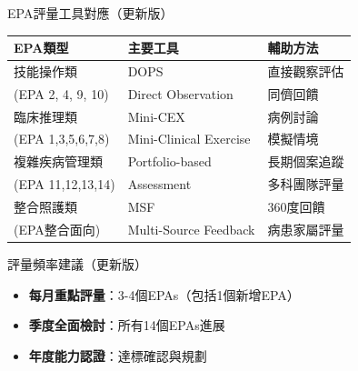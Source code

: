 \documentclass[aspectratio=169]{beamer}
\begin{document}
\begin{frame}{EPA評量工具對應（更新版）}
\begin{table}
\centering
\footnotesize
\begin{tabular}{|l|l|l|}
\hline
\rowcolor{emergency_blue!20}
\textbf{EPA類型} & \textbf{主要工具} & \textbf{輔助方法} \\
\hline
技能操作類 & DOPS & 直接觀察評估 \\
(EPA 2, 4, 9, 10) & \scriptsize Direct Observation & 同儕回饋 \\
\hline
臨床推理類 & Mini-CEX & 病例討論 \\
(EPA 1,3,5,6,7,8) & \scriptsize Mini-Clinical Exercise & 模擬情境 \\
\hline
\rowcolor{emergency_red!10}
複雜疾病管理類 & Portfolio-based & 長期個案追蹤 \\
\rowcolor{emergency_red!10}
(EPA 11,12,13,14) & Assessment & 多科團隊評量 \\
\hline
整合照護類 & MSF & 360度回饋 \\
(EPA整合面向) & \scriptsize Multi-Source Feedback & 病患家屬評量 \\
\hline
\end{tabular}
\end{table}

\vspace{0.5cm}

\begin{block}{評量頻率建議（更新版）}
\begin{itemize}
\item \textbf{每月重點評量}：3-4個EPAs（包括1個新增EPA）
\item \textbf{季度全面檢討}：所有14個EPAs進展
\item \textbf{年度能力認證}：達標確認與規劃
\end{itemize}
\end{block}
\end{frame}
\end{document}
